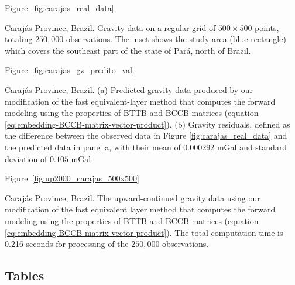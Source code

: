 \documentclass[manuscript,revised]{geophysics}
\begin{document}
Figure~\ref{fig:carajas_real_data}

{Caraj\'as Province, Brazil. Gravity data on a regular grid of $500 \times 500$ points, totaling $250,000$ observations. The inset shows the study area (blue rectangle) which covers the southeast part of the state of Par\'a, north of Brazil.}
\newpage

Figure~\ref{fig:carajas_gz_predito_val}

{Caraj\'as Province, Brazil. (a) Predicted gravity data produced by our modification of the fast equivalent-layer method \citep{siqueira-etal2017}  that computes the forward modeling using the properties of BTTB and BCCB matrices (equation \ref{eq:embedding-BCCB-matrix-vector-product}). (b) Gravity residuals, defined as the difference between the observed data in Figure \ref{fig:carajas_real_data} and the predicted data in panel a, with their mean of 0.000292 mGal and standard deviation of $0.105$ mGal.}
\newpage

Figure~\ref{fig:up2000_carajas_500x500}

{Caraj\'as Province, Brazil. The upward-continued gravity data using our modification of the fast equivalent layer method \citep{siqueira-etal2017} that computes the forward modeling using the properties of BTTB and BCCB matrices (equation \ref{eq:embedding-BCCB-matrix-vector-product}). The total computation time is 0.216 seconds for processing of the $250,000$ observations.}
\newpage

%
%

\subsection{Tables}
\end{document}
